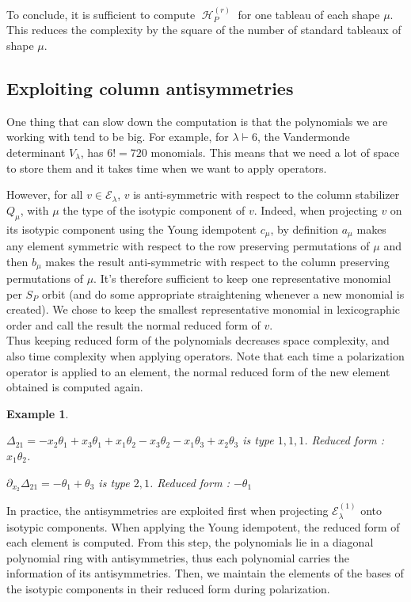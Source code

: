 \documentclass[letter,12pt]{article}
\newcommand{\pauline}[1]{\todo[linecolor=blue,backgroundcolor=blue!25,bordercolor=blue]{#1}}
\DeclareMathOperator{\harmonics}{\mathcal{H}}
\newtheorem{example}{Example}
\begin{document}
	To conclude, it is sufficient to compute $\harmonics_P^{(r)}$ for one tableau of each shape $\mu$. This reduces the complexity by the square of the number of standard tableaux of shape $\mu$.
	
	\subsection{Exploiting column antisymmetries}
	
	One thing that can slow down the computation is that the polynomials we are working with tend to be big. For example, for $\lambda \vdash 6$, the Vandermonde determinant $V_\lambda$, has $6!=720$ monomials. This means that we need a lot of space to store them and it takes time when we want to apply operators. 
	
	However, for all $v \in \mathcal{E}_\lambda$, $v$ is anti-symmetric with respect to the column stabilizer $Q_\mu$, with $\mu$ the type of the isotypic component of $v$. Indeed, when projecting $v$ on its isotypic component using the Young idempotent $c_\mu$, by definition $a_\mu$ makes any element symmetric with respect to the row preserving permutations of $\mu$ and then $b_\mu$ makes the result anti-symmetric with respect to the column preserving permutations of $\mu$. 
	It's therefore sufficient to keep one representative monomial per $S_P$ orbit \pauline{$S_P$ orbit?} (and do some appropriate straightening whenever a new monomial is created). We chose to keep the smallest representative monomial in lexicographic order and call the result the normal reduced form of $v$. \\
	
	Thus keeping reduced form of the polynomials decreases space complexity, and also time complexity when applying operators. Note that each time a polarization operator is applied to an element, the normal reduced form of the new element obtained is computed again. 
	
	\begin{example} ~
		
		$\Delta_{21} = -x_{2} \theta_{1} + x_{3} \theta_{1} + x_{1} \theta_{2} - x_{3} \theta_{2} - x_{1} \theta_{3} + x_{2} \theta_{3}$ is type $1,1,1$.
		Reduced form : $x_1\theta_2$.
		
		$\partial_{x_2}\Delta_{21} = -\theta_1 + \theta_3$ is type $2,1$. 
		Reduced form : $-\theta_1$ 
	\end{example}

	In practice, the antisymmetries are exploited first when projecting $\mathcal{E}_\lambda^{(1)}$ onto isotypic components. When applying the Young idempotent, the reduced form of each element is computed. From this step, the polynomials lie in a diagonal polynomial ring with antisymmetries, thus each polynomial carries the information of its antisymmetries.  
	Then, we maintain the elements of the bases of the isotypic components in their reduced form during polarization. 
\end{document}
